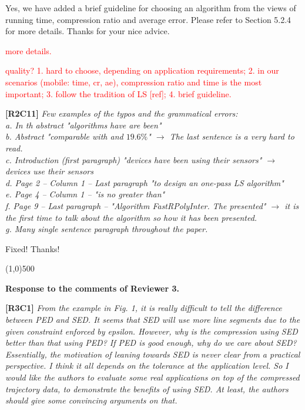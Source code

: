 \documentclass{letter}
\begin{document}
Yes, we have added a brief guideline for choosing an algorithm from the views of running time, compression ratio and average error. Please refer to Section 5.2.4 for more details. Thanks for your nice advice.

\textcolor{red}{more details.}

\textcolor{red}{quality? 1. hard to choose, depending on application requirements; 2. in our scenarios (mobile: time, cr, ae), compression ratio and time is the most important; 3. follow the tradition of LS [ref]; 4. brief guideline.}

\textbf{[R2C11]} \emph{Few examples of the typos and the grammatical errors: \\
   a. In th abstract "algorithms have are been"	\\
   b. Abstract "comparable with and $19.6\%$" $\rightarrow$ The last sentence is a very hard to read.	\\
   c. Introduction (first paragraph) "devices have been using their sensors" $\rightarrow$ devices use their sensors	\\
   d. Page 2 -- Column 1 -- Last paragraph "to design an one-pass LS algorithm" \\
   e. Page 4 -- Column 1 -- "is no greater than" \\
   f. Page 9 -- Last paragraph -- "Algorithm FastRPolyInter. The presented" $\rightarrow$ it is the first time to talk about the algorithm so how it has been presented. \\
   g. Many single sentence paragraph throughout the paper.
}

Fixed! Thanks!


\line(1,0){500}

\textbf{Response to the comments of Reviewer 3.}

\textbf{[R3C1]} \emph{From the example in Fig. 1, it is really difficult to tell the difference between PED and SED. It seems that SED will use more line segments due to the given constraint enforced by epsilon. However, why is the compression using SED better than that using PED? If PED is good enough, why do we care about SED? Essentially, the motivation of leaning towards SED is never clear from a practical perspective. I think it all depends on the tolerance at the application level. So I would like the authors to evaluate some real applications on top of the compressed trajectory data, to demonstrate the benefits of using SED. At least, the authors should give some convincing arguments on that.}
\end{document}
